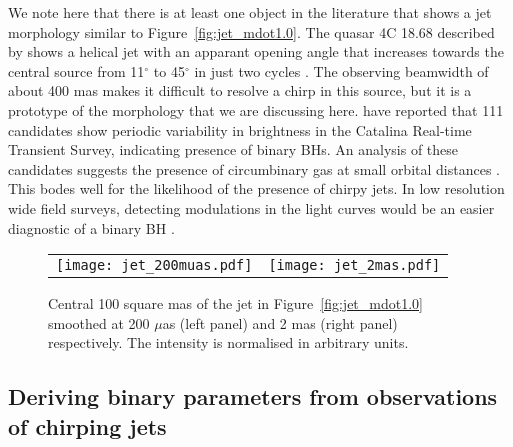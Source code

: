 \documentclass[a4paper,fleqn,usenatbib]{mnras}
\begin{document}
We note here that there is at least one object in the literature that
shows a jet morphology similar to Figure~\ref{fig:jet_mdot1.0}.  The
quasar 4C 18.68 described by \citet{1982ApJ...253L...1G} shows a
helical jet with an apparant opening angle that increases towards the
central source from 11$^\circ$ to 45$^\circ$ in just two cycles
\citep{1982ApJ...262..478G}.  The observing beamwidth of about 400 mas
makes it difficult to resolve a chirp in this source, but it is a
prototype of the morphology that we are discussing here.
\citet{2015MNRAS.453.1562G} have reported that 111 candidates show
periodic variability in brightness in the Catalina Real-time Transient
Survey, indicating presence of binary BHs.  An analysis of these
candidates suggests the presence of circumbinary gas at small orbital
distances \citep{2015MNRAS.453.1562G}.  This bodes well for the
likelihood of the presence of chirpy jets.  In low resolution wide
field surveys, detecting modulations in the light curves would be an
easier diagnostic of a binary BH \citep{2011ApJ...743..136O,
  2011ApJ...734L..37K}.


\begin{figure*}
\begin{center}
  \begin{tabular}{cc}
    \texttt{[image: jet\_200muas.pdf]} &
    \texttt{[image: jet\_2mas.pdf]}
  \end{tabular}
\end{center}
\caption{Central 100 square mas of the jet in
  Figure~\ref{fig:jet_mdot1.0} smoothed at 200 $\mu$as (left panel)
  and 2 mas (right panel) respectively.  The intensity is normalised
  in arbitrary units.}
\label{fig:smooth_jet}
\end{figure*}

\subsection{Deriving binary parameters from observations of chirping jets}
\label{sec:geometric_model}
\end{document}
